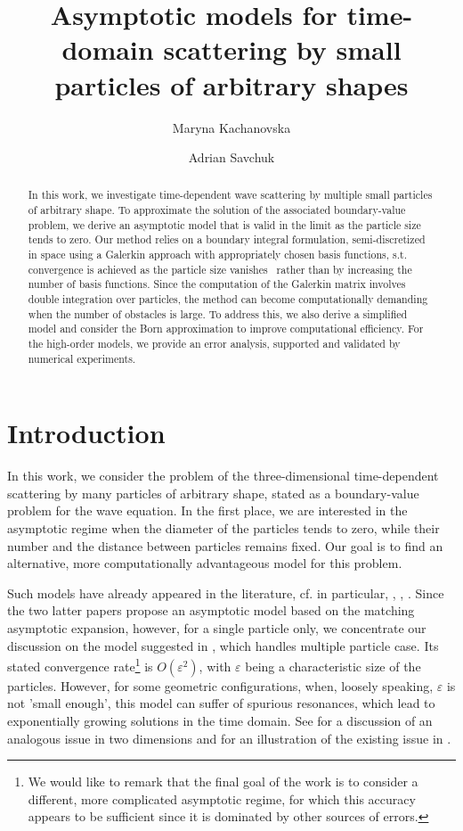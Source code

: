 \documentclass[]{article}
\title{Asymptotic models for time-domain scattering by small particles of
	arbitrary shapes}
\date{}
\author[1]{Maryna Kachanovska}
\author{Adrian Savchuk}
\affil[1]{POEMS, CNRS, Inria, ENSTA, Institut Polytechnique de Paris, 91120 Palaiseau, France}
\numberwithin{equation}{section}
\numberwithin{theorem}{section}
\numberwithin{lemma}{section}
\numberwithin{corollary}{section}
\numberwithin{proposition}{section}
\numberwithin{definition}{section}
\begin{document}
	
	\maketitle
	
	\begin{abstract}
		In this work, we investigate time-dependent wave scattering by multiple small particles of arbitrary shape. To approximate the solution of the associated boundary-value problem, we derive an asymptotic model that is valid in the limit as the particle size tends to zero. Our method relies on a boundary integral formulation, semi-discretized in space using a Galerkin approach with appropriately chosen basis functions, s.t. convergence is achieved as the particle size vanishes
		\, rather than by increasing the number of basis functions. Since the computation of the Galerkin matrix involves double integration over particles, the method can become computationally demanding when the number of obstacles is large. To address this, we also derive a simplified model and consider the Born approximation to improve computational efficiency. For the high-order models, we provide an error analysis, supported and validated by numerical experiments.
	\end{abstract}
	
	
	\section{Introduction}
	In this work, we consider the problem of the three-dimensional time-dependent scattering by many particles of arbitrary shape, stated as a boundary-value problem for the wave equation. In the first place, we are interested in the asymptotic regime when the diameter of the particles tends to zero, while their number and the distance between particles remains fixed. 
	Our goal is to find an alternative, more computationally advantageous model for this problem. 
	
	Such models have already appeared in the literature, cf. in particular, \cite{sini_time_domain}, \cite{barucq}, \cite{korikov}.  Since the two latter papers propose an asymptotic model based on the matching asymptotic expansion, however, for a single particle only, we concentrate our discussion on the model suggested in \cite{sini_time_domain}, which handles multiple particle case. Its stated convergence rate\footnote{We would like to remark that the final goal of the work \cite{sini_time_domain} is to consider a different, more complicated asymptotic regime, for which this accuracy appears to be  sufficient since it is dominated by other sources of errors.} is $O(\varepsilon^2)$, with $\varepsilon$ being a characteristic size of the particles. However, for some geometric configurations, when, loosely speaking, $\varepsilon$ is not 'small enough', this model can suffer of spurious resonances, which lead to exponentially growing solutions in the time domain. See for a discussion of an analogous issue in two dimensions and \cite{adrian_phd} for an illustration of the existing issue in \cite{sini_time_domain}. 
	
\end{document}
